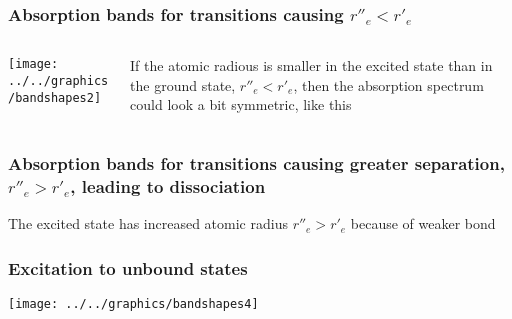 \documentclass[a4paper,titlepage]{article}
\begin{document}
\begin{frame}
\frametitle{Absorption bands for transitions causing \(r''_e < r'_e\)}
\begin{columns}[onlytextwidth]
\begin{column}{.5\textwidth}
\texttt{[image: ../../graphics/bandshapes2]}
\end{column}

\begin{column}{.4\textwidth}
If the atomic radious is smaller in the excited state than in the ground state, \(r''_e < r'_e\), then the absorption spectrum could look a bit symmetric, like this
\end{column}
\end{columns}
\end{frame}


\begin{frame}
\frametitle{Absorption bands for transitions causing greater separation, \(r''_e > r'_e\), leading to dissociation}

\end{frame}

The excited state has increased atomic radius \(r''_e > r'_e\) because of weaker bond

\begin{frame}
\frametitle{Excitation to unbound states}
\texttt{[image: ../../graphics/bandshapes4]}
\end{frame}
\end{document}
